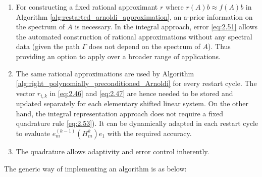 \begin{enumerate}
    \item For constructing a fixed rational approximant $r$ where $r(A)b \approx f(A)b$ in Algorithm \ref{alg:restarted_arnoldi_approximation}, an a-prior information on the spectrum of $A$ is necessary. In the integral approach, error \eqref{eq:2.51} allows the automated construction of rational approximations without any spectral data (given the path $\Gamma$ does not depend on the spectrum of $A$). Thus providing an option to apply over a broader range of applications.

    \item The same rational approximations are used by Algorithm \ref{alg:right_polynomially_preconditioned_Arnoldi}  for every restart cycle. The vector $r_{i,k}$ in \eqref{eq:2.46} and \eqref{eq:2.47} are hence needed to be stored and updated separately for each elementary shifted linear system. On the other hand, the integral representation approach does not require a fixed quadrature rule \eqref{eq:2.53}). It can be dynamically adapted in each restart cycle to evaluate $e_{m}^{(k-1)}(H_{m}^{k})e_{1}$ with the required accuracy.

    \item The quadrature allows adaptivity and error control inherently.
    
\end{enumerate}

The generic way of implementing an algorithm is as below:

